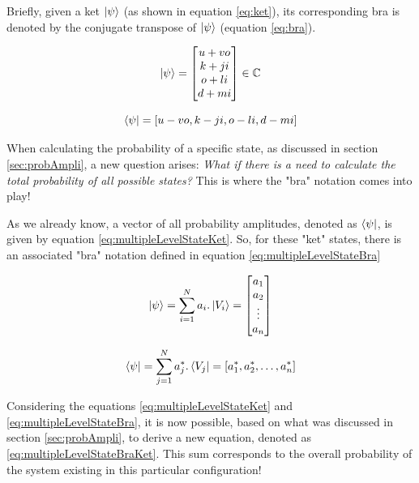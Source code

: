 			\par Briefly, given a ket $\ket{\psi}$ (as shown in equation \ref{eq:ket}), its corresponding bra is denoted by the conjugate transpose of $\ket{\psi}$ (equation \ref{eq:bra}).
			
			\begin{equation}
				\label{eq:ket}
				\ket{\psi} = 
				\begin{bmatrix}
					u + vo \\
					k + ji \\
					o + li \\
					d + mi
				\end{bmatrix} \in \mathbb{C}
			\end{equation}
		
			\begin{equation}
				\label{eq:bra}
				\bra{\psi} = [u - vo, k - ji, o - li, d - mi]
			\end{equation}
		
			\par When calculating the probability of a specific state, as discussed in section \ref{sec:probAmpli}, a new question arises: \textit{What if there is a need to calculate the total probability of all possible states?} This is where the "bra" notation comes into play!\newline
			
			\par As we already know, a vector of all probability amplitudes, denoted as $\bra{\psi}$, is given by equation \ref{eq:multipleLevelStateKet}. So, for these "ket" states, there is an associated "bra" notation defined in equation \ref{eq:multipleLevelStateBra} \cite{notacaoDirac}
			
			\begin{equation}
				\ket{\psi} = \sum_{i=1}^{N} a_i . \ket{V_i} = 
				\begin{bmatrix}
					a_{1} \\
					a_{2} \\
					\vdots \\
					a_{n}
				\end{bmatrix}
				\label{eq:multipleLevelStateKet}
			\end{equation}
			
			\begin{equation}
				\bra{\psi} = \sum_{j=1}^{N} a_j^* . \bra{V_j} = [a_1^*, a_2^*, \dots, a_n^*]
				\label{eq:multipleLevelStateBra}
			\end{equation}				
			
			\par Considering the equations \ref{eq:multipleLevelStateKet} and \ref{eq:multipleLevelStateBra}, it is now possible, based on what was discussed in section \ref{sec:probAmpli}, to derive a new equation, denoted as \ref{eq:multipleLevelStateBraKet}. This sum corresponds to the overall probability of the system existing in this particular configuration!
			
